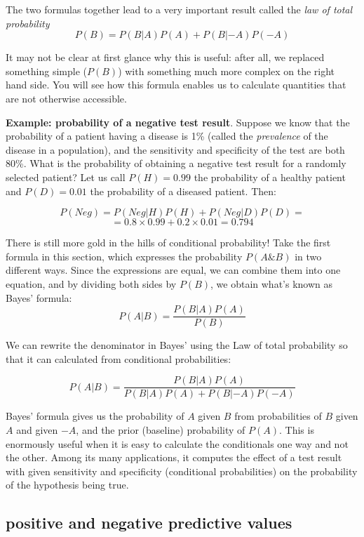 \documentclass[
  letterpaper,
  DIV=11,
  numbers=noendperiod]{scrreprt}
\begin{document}
The two formulas together lead to a very important result called the
\emph{law of total probability} \[
P(B) =  P(B|A) P(A) + P(B|-A)P(-A)
\]

It may not be clear at first glance why this is useful: after all, we
replaced something simple (\(P(B)\)) with something much more complex on
the right hand side. You will see how this formula enables us to
calculate quantities that are not otherwise accessible.

\textbf{Example: probability of a negative test result}. Suppose we know
that the probability of a patient having a disease is 1\% (called the
\emph{prevalence} of the disease in a population), and the sensitivity
and specificity of the test are both 80\%. What is the probability of
obtaining a negative test result for a randomly selected patient? Let us
call \(P(H) = 0.99\) the probability of a healthy patient and
\(P(D) = 0.01\) the probability of a diseased patient. Then:

\[ P(Neg) =  P(Neg | H) P(H) + P(Neg | D)P(D)  = \]
\[ = 0.8 \times 0.99 + 0.2 \times 0.01 = 0.794\]

There is still more gold in the hills of conditional probability! Take
the first formula in this section, which expresses the probability
\(P(A \& B)\) in two different ways. Since the expressions are equal, we
can combine them into one equation, and by dividing both sides by
\(P(B)\), we obtain what's known as Bayes' formula:
\[ P(A|B) = \frac{P(B|A) P(A)}{P(B) }\]

We can rewrite the denominator in Bayes' using the Law of total
probability so that it can calculated from conditional probabilities:

\[
P(A|B) = \frac{P(B|A)P(A)}{P(B|A) P(A) + P(B|-A)P(-A)}
\]

Bayes' formula gives us the probability of \(A\) given \(B\) from
probabilities of \(B\) given \(A\) and given \(-A\), and the prior
(baseline) probability of \(P(A)\). This is enormously useful when it is
easy to calculate the conditionals one way and not the other. Among its
many applications, it computes the effect of a test result with given
sensitivity and specificity (conditional probabilities) on the
probability of the hypothesis being true.

\hypertarget{positive-and-negative-predictive-values}{%
\subsection{positive and negative predictive
values}\label{positive-and-negative-predictive-values}}
\end{document}
